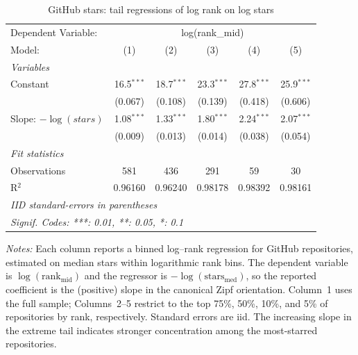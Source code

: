 \documentclass[11pt,a4paper]{article}
\theoremstyle{definition}
\theoremstyle{remark}
\begin{document}
\begin{table}[t]
\centering
\caption{GitHub stars: tail regressions of log rank on log stars}
\label{tab:stars-tail-reg}
\small

\begingroup
\centering
\begin{tabular}{lccccc}
   \tabularnewline \midrule \midrule
   Dependent Variable: & \multicolumn{5}{c}{log(rank\_mid)}\\
   Model:                 & (1)          & (2)          & (3)          & (4)          & (5)\\  
   \midrule
   \emph{Variables}\\
   Constant               & 16.5$^{***}$ & 18.7$^{***}$ & 23.3$^{***}$ & 27.8$^{***}$ & 25.9$^{***}$\\   
                          & (0.067)      & (0.108)      & (0.139)      & (0.418)      & (0.606)\\   
   Slope: $-\log(stars)$  & 1.08$^{***}$ & 1.33$^{***}$ & 1.80$^{***}$ & 2.24$^{***}$ & 2.07$^{***}$\\   
                          & (0.009)      & (0.013)      & (0.014)      & (0.038)      & (0.054)\\   
   \midrule
   \emph{Fit statistics}\\
   Observations           & 581          & 436          & 291          & 59           & 30\\  
   R$^2$                  & 0.96160      & 0.96240      & 0.98178      & 0.98392      & 0.98161\\  
   \midrule \midrule
   \multicolumn{6}{l}{\emph{IID standard-errors in parentheses}}\\
   \multicolumn{6}{l}{\emph{Signif. Codes: ***: 0.01, **: 0.05, *: 0.1}}\\
\end{tabular}
\par\endgroup


\begin{flushleft}
\footnotesize
\emph{Notes:} Each column reports a binned log--rank regression for GitHub repositories, estimated on median stars within logarithmic rank bins. The dependent variable is $\log(\mathrm{rank}_{\text{mid}})$ and the regressor is $-\log(\mathrm{stars}_{\text{med}})$, so the reported coefficient is the (positive) slope in the canonical Zipf orientation. Column~1 uses the full sample; Columns~2--5 restrict to the top 75\%, 50\%, 10\%, and 5\% of repositories by rank, respectively. Standard errors are iid. The increasing slope in the extreme tail indicates stronger concentration among the most-starred repositories.
\end{flushleft}
\end{table}
\end{document}
